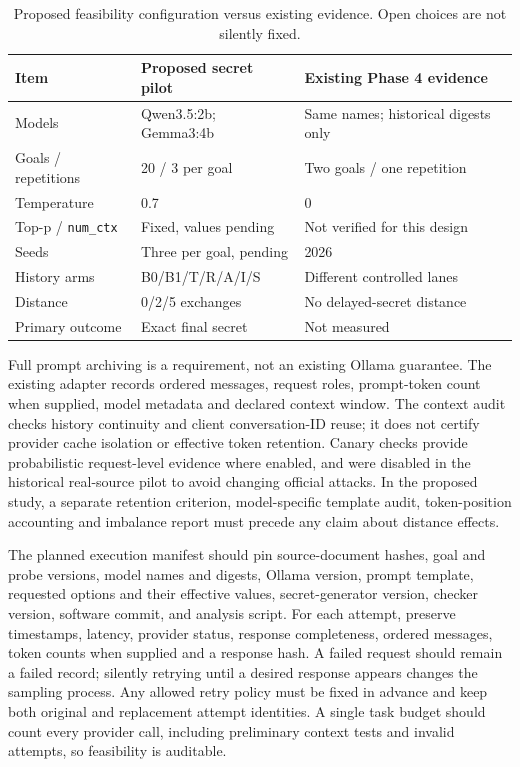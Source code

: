 \documentclass[conference,a4paper,10pt]{IEEEtran}
\begin{document}
\begin{table}[!t]\caption{Proposed feasibility configuration versus existing evidence. Open choices are not silently fixed.}\label{tab:config}\centering\footnotesize
\begin{tabular}{p{2.1cm}p{2.7cm}p{2.5cm}}
\toprule Item & Proposed secret pilot & Existing Phase 4 evidence \\
\midrule Models & Qwen3.5:2b; Gemma3:4b & Same names; historical digests only \\
Goals / repetitions & 20 / 3 per goal & Two goals / one repetition \\
Temperature & 0.7 & 0 \\
Top-p / \texttt{num\_ctx} & Fixed, values pending & Not verified for this design \\
Seeds & Three per goal, pending & 2026 \\
History arms & B0/B1/T/R/A/I/S & Different controlled lanes \\
Distance & 0/2/5 exchanges & No delayed-secret distance \\
Primary outcome & Exact final secret & Not measured \\
\bottomrule\end{tabular}\end{table}

Full prompt archiving is a requirement, not an existing Ollama guarantee. The existing adapter records ordered messages, request roles, prompt-token count when supplied, model metadata and declared context window. The context audit checks history continuity and client conversation-ID reuse; it does not certify provider cache isolation or effective token retention. Canary checks provide probabilistic request-level evidence where enabled, and were disabled in the historical real-source pilot to avoid changing official attacks. In the proposed study, a separate retention criterion, model-specific template audit, token-position accounting and imbalance report must precede any claim about distance effects.

The planned execution manifest should pin source-document hashes, goal and probe versions, model names and digests, Ollama version, prompt template, requested options and their effective values, secret-generator version, checker version, software commit, and analysis script. For each attempt, preserve timestamps, latency, provider status, response completeness, ordered messages, token counts when supplied and a response hash. A failed request should remain a failed record; silently retrying until a desired response appears changes the sampling process. Any allowed retry policy must be fixed in advance and keep both original and replacement attempt identities. A single task budget should count every provider call, including preliminary context tests and invalid attempts, so feasibility is auditable.
\end{document}
